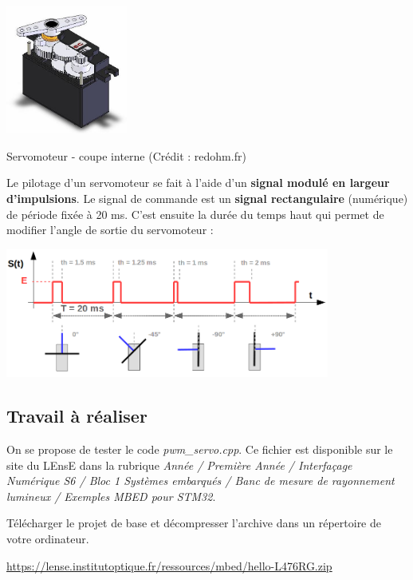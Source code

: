 \documentclass[a4paper,11pt,titlepage]{article} %
\begin{document}
\begin{center}
	\includegraphics[width=0.3\textwidth]{images/MINE_Nucleo_servomoteur-redohm.jpg}
	
	Servomoteur - coupe interne (Crédit : redohm.fr)
\end{center}

Le pilotage d'un servomoteur se fait à l'aide d'un \textbf{signal modulé en largeur d'impulsions}. Le signal de commande est un \textbf{signal rectangulaire} (numérique) de période fixée à 20 ms. C'est ensuite la durée du temps haut qui permet de modifier l'angle de sortie du servomoteur :

\begin{center}
	\includegraphics[width=0.8\textwidth]{images/MINE_Nucleo_servomoteur.png}
\end{center}

\subsection{Travail à réaliser}

On se propose de tester le code \textsl{pwm\_servo.cpp}. Ce fichier est disponible sur le site du LEnsE dans la rubrique \textit{Année / Première Année / Interfaçage Numérique S6 / Bloc 1 Systèmes embarqués / Banc de mesure de rayonnement lumineux / Exemples MBED pour STM32}.

\Manip Télécharger le projet de base et décompresser l'archive dans un répertoire de votre ordinateur.

\href{https://lense.institutoptique.fr/ressources/mbed/hello-L476RG.zip}{https://lense.institutoptique.fr/ressources/mbed/hello-L476RG.zip}
\end{document}
